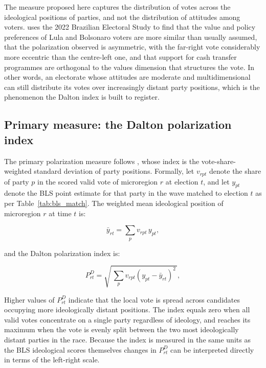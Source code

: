 \documentclass[
	11pt,				%
	oneside,			%
	a4paper,			%
	english,			%
	english				%
	]{abntex2ppgsi}
\theoremstyle{plain}
\theoremstyle{remark}
\theoremstyle{plain}%
\theoremstyle{remark}%
\begin{document}
The measure proposed here captures the distribution of votes across the ideological positions of parties, and not the distribution of attitudes among voters.  uses the 2022 Brazilian Electoral Study to find that the value and policy preferences of Lula and Bolsonaro voters are more similar than usually assumed, that the polarization observed is asymmetric, with the far-right vote considerably more eccentric than the centre-left one, and that support for cash transfer programmes are orthogonal to the values dimension that structures the vote. In other words, an electorate whose attitudes are moderate and multidimensional can still distribute its votes over increasingly distant party positions, which is the phenomenon the Dalton index is built to register. 

\subsection{Primary measure: the Dalton polarization index}
 
The primary polarization measure follows ,
whose index is the vote-share-weighted standard deviation of party
positions.
Formally, let $v_{rpt}$ denote the share of party $p$ in the scored valid
vote of microregion $r$ at election $t$,
and let $y_{pt}$ denote the BLS point estimate for that party in the
wave matched to election $t$ as per Table~\ref{tab:bls_match}.
The weighted mean ideological position of microregion $r$ at time
$t$ is:
 
\begin{equation}
    \bar{y}_{rt} = \sum_{p} v_{rpt} \, y_{pt},
    \label{eq:ymean}
\end{equation}
 
\noindent and the Dalton polarization index is:
 
\begin{equation}
    P^{D}_{rt} = 
        \sqrt{\, \sum_{p} v_{rpt} \left( y_{pt} - \bar{y}_{rt}
        \right)^{2} \,},
    \label{eq:poldalton}
\end{equation}
 
\noindent 
 
Higher values of $P^{D}_{rt}$ indicate that the local vote is
spread across candidates occupying more ideologically distant
positions.
The index equals zero when all valid votes concentrate on a single
party regardless of ideology, and reaches its maximum when the
vote is evenly split between the two most ideologically distant
parties in the race.
Because the index is measured in the same units as the BLS
ideological scores themselves changes in
$P^{D}_{rt}$ can be interpreted directly in terms of the left-right
scale.
 
\end{document}
